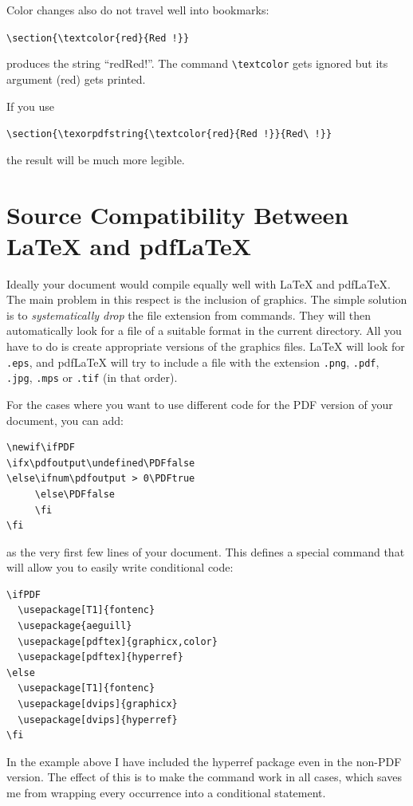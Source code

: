 \documentclass[twoside,11pt,letterpaper]{article}
\begin{document}
Color changes also do not travel well into bookmarks:
\begin{code}
\verb+\section{\textcolor{red}{Red !}}+
\end{code}
produces the string ``redRed!''. The command \verb+\textcolor+ gets ignored
but its argument (red) gets printed. 

If you use
\begin{code}
\verb+\section{\texorpdfstring{\textcolor{red}{Red !}}{Red\ !}}+
\end{code}
the result will be much more legible.


\section{Source Compatibility Between \LaTeX{} and pdf\LaTeX{}}
\label{sec:pdfcompat}


Ideally your document would compile equally well with \LaTeX{} and
pdf\LaTeX{}. The main problem in this respect is the inclusion of
graphics. The simple solution is to \emph{systematically drop} the
file extension from  commands. They will then
automatically look for a file of a suitable format in the current
directory. All you have to do is create appropriate versions of the
graphics files. \LaTeX{} will look for \texttt{.eps}, and pdf\LaTeX{}
will try to include a file with the extension
\texttt{.png}, \texttt{.pdf}, \texttt{.jpg}, \texttt{.mps} or \texttt{.tif}
(in that order).


For the cases where you want to use different code for the
PDF version of your document, you can add:
\begin{code}
\begin{verbatim}
\newif\ifPDF
\ifx\pdfoutput\undefined\PDFfalse
\else\ifnum\pdfoutput > 0\PDFtrue
     \else\PDFfalse
     \fi
\fi
\end{verbatim}
\end{code}
as the very first few lines of your document. This defines a special
command that will allow you to easily write conditional code:
\begin{code}
\begin{verbatim}
\ifPDF
  \usepackage[T1]{fontenc}
  \usepackage{aeguill}
  \usepackage[pdftex]{graphicx,color}
  \usepackage[pdftex]{hyperref}
\else    
  \usepackage[T1]{fontenc}
  \usepackage[dvips]{graphicx}
  \usepackage[dvips]{hyperref}
\fi
\end{verbatim}
\end{code}
In the example above I have included the hyperref package even in the
non-PDF version. The effect of this is to make the  command
work in all cases, which saves me from wrapping every occurrence into a
conditional statement.
\end{document}

